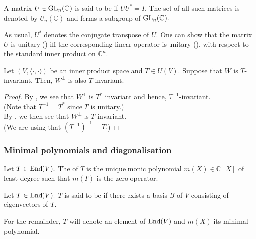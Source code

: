 \begin{defn}%
	\label{defn:unitarymatrix}
	A matrix $U \in \operatorname{GL}_n(\mathbb{C})$ is said to be  if $UU^* = I.$ The set of all such matrices is denoted by $U_n(\mathbb{C})$ and forms a subgroup of $\operatorname{GL}_n(\mathbb{C}).$
\end{defn}
As usual, $U^*$ denotes the conjugate transpose of $U.$ One can show that the matrix $U$ is unitary () iff the corresponding linear operator is unitary (), with respect to the standard inner product on $\mathbb{C}^n.$

\begin{cor} \label{cor:unitaryinvariance}
	Let $(V, \langle \cdot, \cdot\rangle)$ be an inner product space and $T \in U(V).$ Suppose that $W$ is $T$-invariant. Then, $W^\perp$ is also $T$-invariant.
\end{cor}
\begin{proof} 
	By , we see that $W^\perp$ is $T^*$ invariant and hence, $T^{-1}$-invariant.\\
	(Note that $T^{-1} = T^*$ since $T$ is unitary.)\\
	By , we then see that $W^\perp$ is $T$-invariant. \\
	(We are using that $(T^{-1})^{-1} = T.$)
\end{proof}

\subsubsection{Minimal polynomials and diagonalisation} 

\begin{defn}%
	Let $T \in \operatorname{End}(V).$ The  of $T$ is the unique monic polynomial $m(X) \in \mathbb{C}[X]$ of least degree such that $m(T)$ is the zero operator.
\end{defn} 

\begin{defn}%
	Let $T \in \operatorname{End}(V).$ $T$ is said to be  if there exists a basis $B$ of $V$ consisting of eigenvectors of $T.$
\end{defn}

For the remainder, $T$ will denote an element of $\operatorname{End}(V)$ and $m(X)$ its minimal polynomial.

